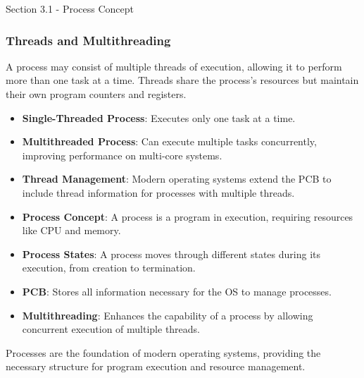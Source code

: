 \begin{notes}{Section 3.1 - Process Concept}
    \subsubsection*{Threads and Multithreading}
    
    A process may consist of multiple threads of execution, allowing it to perform more than one task at a time. Threads share the process's resources but maintain their own program counters and registers.
    
    \begin{highlight}
    
        \begin{itemize}
            \item \textbf{Single-Threaded Process}: Executes only one task at a time.
            \item \textbf{Multithreaded Process}: Can execute multiple tasks concurrently, improving performance on multi-core systems.
            \item \textbf{Thread Management}: Modern operating systems extend the PCB to include thread information for processes with multiple threads.
        \end{itemize}
    
    \end{highlight}
    
    \begin{highlight}
    
        \begin{itemize}
            \item \textbf{Process Concept}: A process is a program in execution, requiring resources like CPU and memory.
            \item \textbf{Process States}: A process moves through different states during its execution, from creation to termination.
            \item \textbf{PCB}: Stores all information necessary for the OS to manage processes.
            \item \textbf{Multithreading}: Enhances the capability of a process by allowing concurrent execution of multiple threads.
        \end{itemize}
    
    Processes are the foundation of modern operating systems, providing the necessary structure for program execution and resource management.
    
    \end{highlight}
\end{notes}

